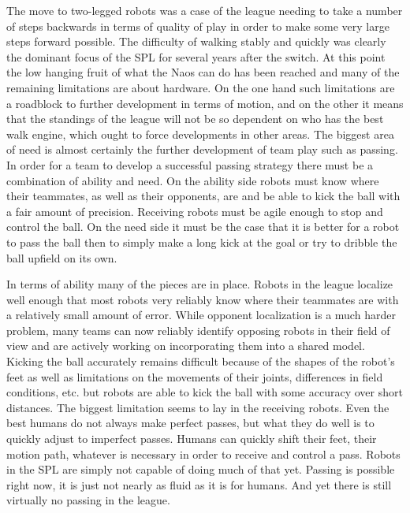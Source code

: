 \documentclass{llncs}
\begin{document}
The move to two-legged robots was a case of the league needing to take a number
of steps backwards in terms of quality of play in order to make some very large
steps forward possible. The difficulty of walking stably and quickly was clearly the dominant
focus of the SPL for several years after the switch. At this point the
low hanging fruit of what the Naos can do has been reached and many of the
remaining limitations are about hardware. On the one hand such limitations
are a roadblock to further development in terms of motion, and on the other
it means that the standings of the league will not be so dependent on who
has the best walk engine, which ought to force developments in other areas.
The biggest area of need is almost certainly the further development of team play
such as passing. In order for a team to develop a successful passing strategy
there must be a combination of ability and need. On the ability side robots must
know where their teammates, as well as their opponents, are and be able to kick the ball with a fair amount
of precision. Receiving robots must be agile enough to stop and control the
ball. On the need side it must be the case that it is better for a robot to pass
the ball then to simply make a long kick at the goal or try to dribble the ball
upfield on its own.

In terms of ability many of the pieces are in place. Robots in the league localize
well enough that most robots very reliably know where their teammates are
with a relatively small amount of error. While opponent localization is a much
harder problem, many teams can now reliably identify opposing robots in their field
of view and are actively working on incorporating them into a shared model.
Kicking the ball accurately remains difficult
because of the shapes of the robot's feet as well as limitations on the movements
of their joints, differences in field conditions, etc. but robots are able to kick
the ball with some accuracy over short distances. The biggest limitation seems to
lay in the receiving robots. Even the best humans do not always make perfect passes,
but what they do well is to quickly adjust to imperfect passes. Humans can quickly
shift their feet, their motion path, whatever is necessary in order to receive and
control a pass. Robots in the SPL are simply not capable of doing much
of that yet. Passing is possible right now, it is just  not  nearly as fluid as it
is for humans. And yet there is still virtually no passing in the league.
\end{document}
